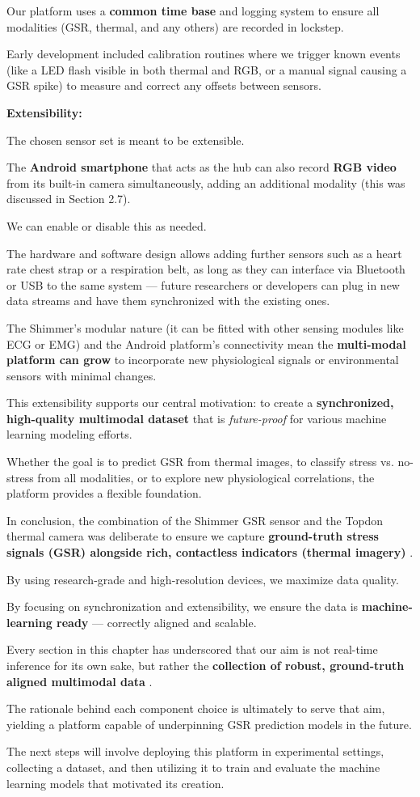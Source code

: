 Our platform uses a \textbf{common time base}
 and logging system to ensure all modalities (GSR, thermal, and any others) are
 recorded in lockstep.

Early development included calibration routines where we trigger known events (like a
LED flash visible in both thermal and RGB, or a manual signal causing a GSR spike) to
measure and correct any offsets between sensors.

\textbf{Extensibility:}

The chosen sensor set is meant to be extensible.

The \textbf{Android smartphone}
 that acts as the hub can also record \textbf{RGB video}
 from its built-in camera simultaneously, adding an additional modality (this was
 discussed in Section 2.7).

We can enable or disable this as needed.

The hardware and software design allows adding further sensors such as a heart rate
chest strap or a respiration belt, as long as they can interface via Bluetooth or USB
to the same system --- future researchers or developers can plug in new data streams
and have them synchronized with the existing ones.

The Shimmer's modular nature (it can be fitted with other sensing modules like ECG or
EMG) and the Android platform's connectivity mean the \textbf{multi-modal platform
can grow}
 to incorporate new physiological signals or environmental sensors with minimal
 changes.

This extensibility supports our central motivation: to create a \textbf{synchronized,
high-quality multimodal dataset}
 that is \textit{future-proof} for various machine learning modeling efforts.

Whether the goal is to predict GSR from thermal images, to classify stress vs.
no-stress from all modalities, or to explore new physiological correlations, the
platform provides a flexible foundation.

In conclusion, the combination of the Shimmer GSR sensor and the Topdon thermal
camera was deliberate to ensure we capture \textbf{ground-truth stress signals (GSR)
alongside rich, contactless indicators (thermal imagery)}
.

By using research-grade and high-resolution devices, we maximize data quality.

By focusing on synchronization and extensibility, we ensure the data is
\textbf{machine-learning ready}
 --- correctly aligned and scalable.

Every section in this chapter has underscored that our aim is not real-time inference
for its own sake, but rather the \textbf{collection of robust, ground-truth aligned
multimodal data}
.

The rationale behind each component choice is ultimately to serve that aim, yielding
a platform capable of underpinning GSR prediction models in the future.

The next steps will involve deploying this platform in experimental settings,
collecting a dataset, and then utilizing it to train and evaluate the
machine learning models that motivated its creation.
